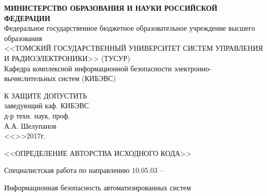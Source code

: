 \newpage
{}

\begin{center}
 \textbf{МИНИСТЕРСТВО ОБРАЗОВАНИЯ И НАУКИ РОССИЙСКОЙ ФЕДЕРАЦИИ}\\
 Федеральное государственное бюджетное образовательное учреждение высшего образования\\
 <<ТОМСКИЙ ГОСУДАРСТВЕННЫЙ УНИВЕРСИТЕТ СИСТЕМ УПРАВЛЕНИЯ И РАДИОЭЛЕКТРОНИКИ>> (ТУСУР)\\
 Кафедра комплексной информационной безопасности электронно-вычислительных систем (КИБЭВС)\\
\end{center} 

\vfill

\begin{flushright}
\begin{minipage}{0.45\textwidth}
 \begin{flushleft}
  К ЗАЩИТЕ ДОПУСТИТЬ\\
  заведующий каф. КИБЭВС\\
  д-р техн. наук, проф.\\
  \underline{\hspace{3cm}}А.А. Шелупанов \\
  <<\underline{\hspace{1cm}}>>\underline{\hspace{3cm}}2017г.\\
 \end{flushleft}
\end{minipage}
\end{flushright}

\vfill



\begin{center}
<<ОПРЕДЕЛЕНИЕ АВТОРСТВА ИСХОДНОГО КОДА>>

Специалистская работа по направлению 10.05.03 --

Информационная безопасность автоматизированных систем
\end{center}


\vfill


